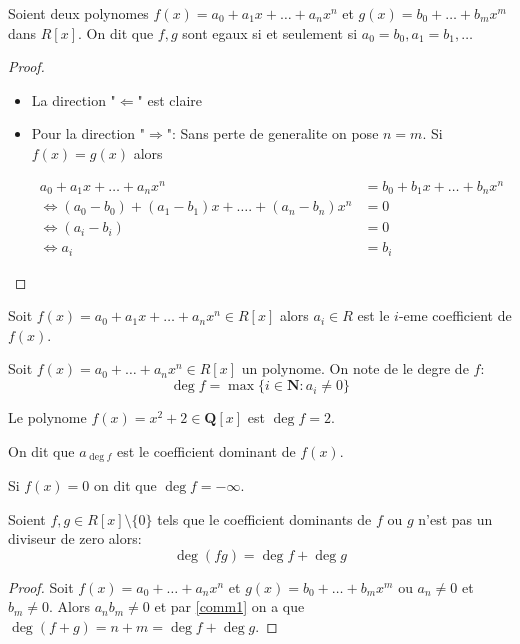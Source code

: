 \begin{proposition}
Soient deux polynomes $f(x)=a_{0}+a_{1}x+\dots+a_{n}x^{n}$ et $g(x)=b_{0}+\dots+b_{m}x^{m}$ dans $R[x]$. On dit que $f,g$ sont egaux si et seulement si $a_{0}=b_{0},a_{1}=b_{1},\dots$
\end{proposition}
\begin{proof}
\begin{itemize}
\item La direction "$\Leftarrow$" est claire
\item Pour la direction "$\Rightarrow$": Sans perte de generalite on pose $n=m$. Si $f(x)=g(x)$ alors 

\begin{align*}
 a_{0}+a_{1}x+\dots+a_{n}x^{n} & =b_{0}+b_{1}x+\dots+b_{n}x^{n} \\
\Leftrightarrow(a_{0}-b_{0})+(a_{1}-b_{1})x+\dots.+(a_{n}-b_{n})x^{n} & =0 \\
\Leftrightarrow(a_{i}-b_{i}) & =0 \\
\Leftrightarrow a_{i} & =b_{i}
\end{align*}

\end{itemize}
\end{proof}
\begin{definition}
Soit $f(x)=a_{0}+a_{1}x+\dots+a_{n}x^{n}\in R[x]$ alors $a_{i}\in R$ est le $i$-eme coefficient de $f(x)$.
\end{definition}
\begin{definition}
Soit $f(x)=a_{0}+\dots+a_{n}x^{n}\in R[x]$ un polynome. On note de le degre de $f$:
$$
\deg f =\max\{i\in \mathbf{N}:a_{i}\neq 0 \}
$$
\end{definition}
\begin{example}
Le polynome $f(x)=x^{2}+2\in \mathbf{Q}[x]$ est $\deg f=2$.
\end{example}
\begin{definition}
On dit que $a_{\deg f}$ est le coefficient dominant de $f(x)$.
\end{definition}
\begin{remark}
Si $f(x)=0$ on dit que $\deg f=-\infty$.
\end{remark}
\begin{theorem}
Soient $f,g\in R[x]\setminus \{ 0 \}$ tels que le coefficient dominants de $f$ ou $g$ n'est pas un diviseur de zero alors:
$$
\deg (fg)=\deg f+\deg g
$$
\end{theorem}
\begin{proof}
Soit $f(x)=a_{0}+\dots+a_{n}x^{n}$ et $g(x)=b_{0}+\dots+b_{m}x^{m}$ ou $a_{n}\neq 0$ et $b_{m}\neq 0$. Alors $a_{n}b_{m}\neq 0$ et par \ref{comm1} on a que $\deg(f+g)=n+m=\deg f +\deg g$.
\end{proof}

